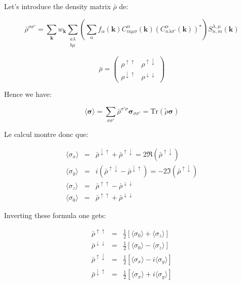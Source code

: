 \documentclass{article}
\begin{document}
\noindent Let's introduce the density matrix $\bar{\rho}$ de:

\[ \bar{\rho}^{\sigma \sigma'}=
\sum_{\mathbf{k}}  w_{\mathbf{k}}
\sum_{\substack{a \lambda\\ b \mu}} 
\left(\sum_{\alpha}
f_{\alpha}(\mathbf{k}) 
C_{m \mu \sigma}^{\alpha}(\mathbf{k})(C_{n \lambda \sigma'}^{\alpha}(\mathbf{k}))^{\star} \right)
S_{n,m}^{\lambda,\mu}(\mathbf{k}) \]

\[ \bar{\rho}=
\left( \begin{array}{cc} \rho^{\uparrow \uparrow} & \rho^{\uparrow \downarrow} \\
\rho^{\downarrow \uparrow} & \rho^{\downarrow 
\downarrow}
\end{array} \right) \]

\noindent
Hence we have:

\[\langle \bm{\sigma}\rangle= \sum_{\sigma \sigma'} \bar{\rho}^{\sigma' \sigma} \bm{\sigma}_{\sigma \sigma'}=
\text{Tr} (\tilde{\rho}\bm{\sigma}) \]



\noindent
Le calcul montre donc que:

\[ \begin{array}{lcl} 
\langle \sigma_x \rangle&=&     \bar{\rho}^{\downarrow \uparrow} +  \bar{\rho}^{\uparrow \downarrow} = 2\Re(\bar{\rho}^{\uparrow \downarrow}) \\ 
\langle \sigma_y\rangle &=&   i(\bar{\rho}^{\uparrow \downarrow} - \bar{\rho}^{\downarrow \uparrow} )= -2\Im(\bar{\rho}^{\uparrow \downarrow}) \\ 
\langle \sigma_z \rangle&=&     \bar{\rho}^{\uparrow \uparrow}    -  \bar{\rho}^{\downarrow \downarrow} \\
\langle\sigma_0 \rangle&=&     \bar{\rho}^{\uparrow \uparrow}    +  \bar{\rho}^{\downarrow \downarrow}
\end{array}
\]

\noindent
Inverting these formula one gets:

\[ \begin{array}{lcl} 
 \bar{\rho}^{\uparrow \uparrow}      &=&  \displaystyle \frac{1}{2}[\langle \sigma_0\rangle+  \langle\sigma_z\rangle]     \\ 
 \bar{\rho}^{\downarrow \downarrow}  &=&  \displaystyle \frac{1}{2}[\langle\sigma_0\rangle-  \langle\sigma_z\rangle]   \\ 
 \bar{\rho}^{\uparrow \downarrow}    &=&  \displaystyle \frac{1}{2}[\langle\sigma_x\rangle- i\langle\sigma_y\rangle]   \\
 \bar{\rho}^{\downarrow \uparrow}    &=&  \displaystyle \frac{1}{2}[\langle\sigma_x\rangle+ i\langle\sigma_y\rangle]   
\end{array}
\]
\end{document}
